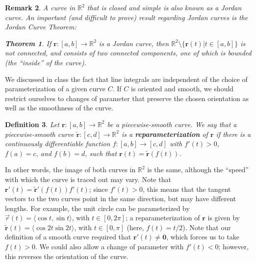 \documentclass[12pt,letterpaper]{article}
\newtheorem{theorem}{Theorem}[section]
\newtheorem{rem}[theorem]{Remark}
\newenvironment{remark}{\begin{rem}\rm}{\end{rem}}
\newtheorem{definition}[theorem]{Definition}
\newcommand{\R}{\mathbb{R}}
\renewcommand{\r}{\mathbf{r}}
\begin{document}
\begin{remark}
A curve in $\R^2$ that is closed and simple is also known as a {\em Jordan curve}.  An important (and difficult to prove) result regarding Jordan curves is the {\em Jordan Curve Theorem}:
\begin{theorem}
If $\r:[a,b]\to \R^2$ is a Jordan curve, then $\R^2\setminus\{\r(t)|t\in[a,b]\}$ is not connected, and consists of two connected components, one of which is bounded (the ``inside'' of the curve).
\end{theorem}
\end{remark}
We discussed in class the fact that line integrals are independent of the choice of parameterization of a given  curve $C$. If $C$ is oriented and smooth, we should restrict ourselves to changes of parameter that preserve the chosen orientation as well as the smoothness of the curve.
\begin{definition}
Let $\r:[a,b]\to\R^2$ be a piecewise-smooth curve.  We say that a piecewise-smooth curve $\tilde{\r}:[c,d]\to\R^2$ is a {\bf reparameterization} of $\r$ if there is a continuously differentiable function $f:[a,b]\to [c,d]$ with $f'(t)>0$, $f(a)=c$, and $f(b)=d$, such that $\r(t) = \tilde{\r}(f(t))$.
\end{definition}
In other words, the image of both curves in $\R^2$ is the same, although the ``speed'' with which the curve is traced out may vary.  Note that $\r'(t) = \tilde{\r}'(f(t))f'(t)$; since $f'(t)>0$, this means that the tangent vectors to the two curves point in the same direction, but may have different lengths.  For example, the unit circle can be parameterized by $\vec{r}(t)=\langle\cos t, \sin t\rangle$, with $t\in [0,2\pi]$; a reparameterization of $\r$ is given by $\tilde{\r}(t) = \langle\cos 2t \sin 2t\rangle$, with $t\in [0,\pi]$ (here, $f(t) = t/2$). Note that our definition of a smooth curve required that $\r'(t)\neq \mathbf{0}$, which forces us to take $f(t)>0$. We could also allow a change of parameter with $f'(t)<0$; however, this reverses the orientation of the curve.
\end{document}
